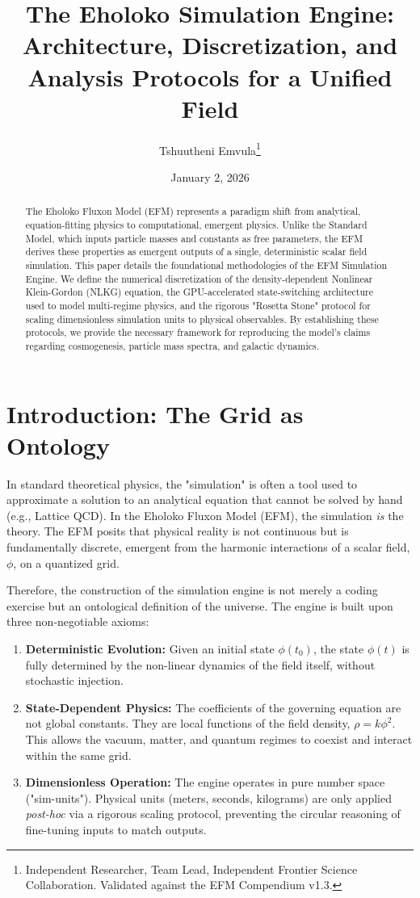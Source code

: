 \documentclass[11pt, twoside]{article}
\title{The Eholoko Simulation Engine: Architecture, Discretization, and Analysis Protocols for a Unified Field}
\author{Tshuutheni Emvula\thanks{Independent Researcher, Team Lead, Independent Frontier Science Collaboration. Validated against the EFM Compendium v1.3.}}
\date{January 2, 2026}
\begin{document}
\maketitle
\thispagestyle{empty}

\begin{abstract}
The Eholoko Fluxon Model (EFM) represents a paradigm shift from analytical, equation-fitting physics to computational, emergent physics. Unlike the Standard Model, which inputs particle masses and constants as free parameters, the EFM derives these properties as emergent outputs of a single, deterministic scalar field simulation. This paper details the foundational methodologies of the EFM Simulation Engine. We define the numerical discretization of the density-dependent Nonlinear Klein-Gordon (NLKG) equation, the GPU-accelerated state-switching architecture used to model multi-regime physics, and the rigorous "Rosetta Stone" protocol for scaling dimensionless simulation units to physical observables. By establishing these protocols, we provide the necessary framework for reproducing the model's claims regarding cosmogenesis, particle mass spectra, and galactic dynamics.
\end{abstract}

\clearpage
\tableofcontents
\clearpage

\section{Introduction: The Grid as Ontology}

In standard theoretical physics, the "simulation" is often a tool used to approximate a solution to an analytical equation that cannot be solved by hand (e.g., Lattice QCD). In the Eholoko Fluxon Model (EFM), the simulation \textit{is} the theory. The EFM posits that physical reality is not continuous but is fundamentally discrete, emergent from the harmonic interactions of a scalar field, $\phi$, on a quantized grid.

Therefore, the construction of the simulation engine is not merely a coding exercise but an ontological definition of the universe. The engine is built upon three non-negotiable axioms:
\begin{enumerate}
    \item \textbf{Deterministic Evolution:} Given an initial state $\phi(t_0)$, the state $\phi(t)$ is fully determined by the non-linear dynamics of the field itself, without stochastic injection.
    \item \textbf{State-Dependent Physics:} The coefficients of the governing equation are not global constants. They are local functions of the field density, $\rho = k\phi^2$. This allows the vacuum, matter, and quantum regimes to coexist and interact within the same grid.
    \item \textbf{Dimensionless Operation:} The engine operates in pure number space ("sim-units"). Physical units (meters, seconds, kilograms) are only applied \textit{post-hoc} via a rigorous scaling protocol, preventing the circular reasoning of fine-tuning inputs to match outputs.
\end{enumerate}
\end{document}
